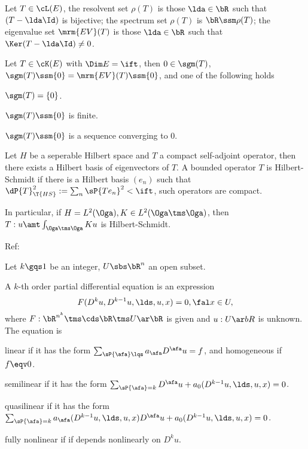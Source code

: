 \documentclass[article, a4paper, twoside]{universal}
\begin{document}
\begin{dfn}
    Let $T\in\cL(E)$, the resolvent set $\rho(T)$ is those $\lda\in\bR$ such that $(T-\lda \Id)$ is bijective; the spectrum set $\rho(T)$ is $\bR\ssm\rho(T)$; the eigenvalue set $\mrm{EV}(T)$ is those $\lda\in\bR$ such that $\Ker(T-\lda\Id)\neq 0$.
\end{dfn}

\begin{thm}[Theorem~6.8]
    Let $T\in\cK(E)$ with $\Dim E=\ift$, then $0\in\sgm(T)$, $\sgm(T)\ssm\{0\}=\mrm{EV}(T)\ssm\{0\}$, and one of the following holds
    \begin{itm}
        \item $\sgm(T)=\{0\}$.
        \item $\sgm(T)\ssm\{0\}$ is finite.
        \item $\sgm(T)\ssm\{0\}$ is a sequence converging to $0$.
    \end{itm}
\end{thm}

\begin{thm}
    Let $H$ be a seperable Hilbert space and $T$ a compact self-adjoint operator, then there exists a Hilbert basis of eigenvectors of $T$. A bounded operator $T$ is Hilbert-Schmidt if there is a Hilbert basis $(e_{n})$ such that $\dP{T}_{\T{HS}}^{2}:=\sum_{n}\sP{Te_{n}}^{2}<\ift$, such operators are compact.

    In particular, if $H=L^{2}(\Oga), K\in L^{2}(\Oga\tms\Oga)$, then $T:u\amt\int_{\Oga\tms\Oga}Ku$ is Hilbert-Schmidt.
\end{thm}



Ref:~\cite{Evans2010}

\begin{dfn}
    Let $k\gqs1$ be an integer, $U\sbs \bR^{n}$ an open subset.

    A $k$-th order partial differential equation is an expression
    \[
        F(D^{k}u,D^{k-1}u,\lds,u,x)=0, \fal x\in U,
    \]
    where $F:\bR^{n^{k}}\tms\cds \bR\tms U\ar\bR$ is given and $u:U\ar bR$ is unknown. The equation is
    \begin{enr}[label=(\arabic*)]
        \item linear if it has the form $\sum_{\sP{\afa}\lqs}a_{\afa}D^{\afa}u=f$, and homogeneous if $f\eqv0$.
        \item semilinear if it has the form $\sum_{\sP{\afa}=k}D^{\afa}u+a_{0}(D^{k-1}u,\lds,u,x)=0$.
        \item quasilinear if it has the form $\sum_{\sP{\afa}=k}a_{\afa}(D^{k-1}u,\lds,u,x)D^{\afa}u+a_{0}(D^{k-1}u,\lds,u,x)=0$.
        \item fully nonlinear if if depends nonlinearly on $D^{k}u$.
    \end{enr}
\end{dfn}
\end{document}
